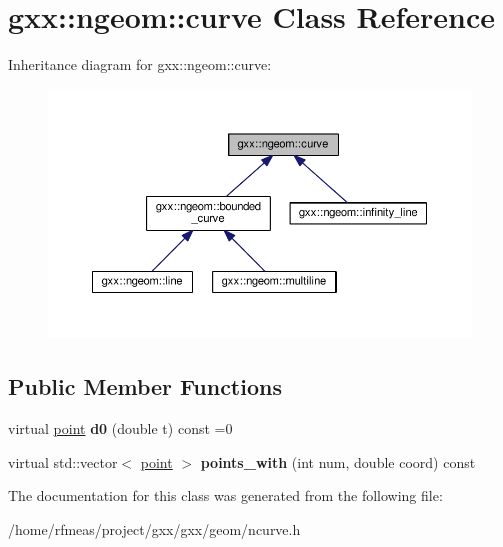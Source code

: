 \hypertarget{classgxx_1_1ngeom_1_1curve}{}\section{gxx\+:\+:ngeom\+:\+:curve Class Reference}
\label{classgxx_1_1ngeom_1_1curve}


Inheritance diagram for gxx\+:\+:ngeom\+:\+:curve\+:
\nopagebreak
\begin{figure}[H]
\begin{center}
\leavevmode
\includegraphics[width=350pt]{classgxx_1_1ngeom_1_1curve__inherit__graph}
\end{center}
\end{figure}
\subsection*{Public Member Functions}
\begin{DoxyCompactItemize}
\item 
virtual \hyperlink{classgxx_1_1ngeom_1_1point}{point} {\bfseries d0} (double t) const =0\hypertarget{classgxx_1_1ngeom_1_1curve_a0fc5baa675a79abdb0218338b2373719}{}\label{classgxx_1_1ngeom_1_1curve_a0fc5baa675a79abdb0218338b2373719}

\item 
virtual std\+::vector$<$ \hyperlink{classgxx_1_1ngeom_1_1point}{point} $>$ {\bfseries points\+\_\+with} (int num, double coord) const \hypertarget{classgxx_1_1ngeom_1_1curve_a9da6484cf7859a66753107e3d231abf4}{}\label{classgxx_1_1ngeom_1_1curve_a9da6484cf7859a66753107e3d231abf4}

\end{DoxyCompactItemize}


The documentation for this class was generated from the following file\+:\begin{DoxyCompactItemize}
\item 
/home/rfmeas/project/gxx/gxx/geom/ncurve.\+h\end{DoxyCompactItemize}
